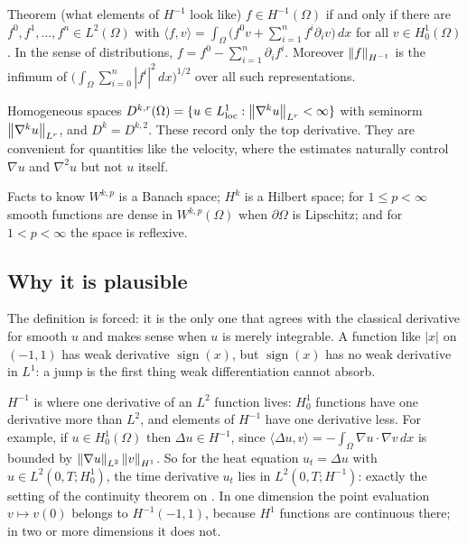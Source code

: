 \begin{thmbox}{Theorem (what elements of $H^{-1}$ look like)}
$f \in H^{-1}(\Omega)$ if and only if there are $f^0, f^1, \dots, f^n \in L^2(\Omega)$ with $\langle f, v\rangle = \int_\Omega \big(f^0 v + \sum_{i=1}^n f^i \partial_i v\big)\,dx$ for all $v \in H^1_0(\Omega)$. In the sense of distributions, $f = f^0 - \sum_{i=1}^n \partial_i f^i$. Moreover $\left\lVert f\right\rVert_{H^{-1}}$ is the infimum of $\big(\int_\Omega \sum_{i=0}^n |f^i|^2\,dx\big)^{1/2}$ over all such representations.
\end{thmbox}

\begin{defnbox}{Homogeneous spaces}
%
$D^{k,r}(\Omega) = \{ u \in L^1_{\mathrm{loc}} : \left\lVert \nabla^k u\right\rVert_{L^r} < \infty \}$ with seminorm $\left\lVert \nabla^k u\right\rVert_{L^r}$, and $D^k = D^{k,2}$. These record only the top derivative. They are convenient for quantities like the velocity, where the estimates naturally control $\nabla u$ and $\nabla^2 u$ but not $u$ itself.
\end{defnbox}

\begin{rmkbox}{Facts to know}
$W^{k,p}$ is a Banach space; $H^k$ is a Hilbert space; for $1 \le p < \infty$ smooth functions are dense in $W^{k,p}(\Omega)$ when $\partial\Omega$ is Lipschitz; and for $1 < p < \infty$ the space is reflexive.
\end{rmkbox}

\subsection*{Why it is plausible}

The definition is forced: it is the only one that agrees with the classical derivative for smooth $u$ and makes sense when $u$ is merely integrable. A function like $|x|$ on $(-1,1)$ has weak derivative $\operatorname{sign}(x)$, but $\operatorname{sign}(x)$ has no weak derivative in $L^1$: a jump is the first thing weak differentiation cannot absorb.

$H^{-1}$ is where one derivative of an $L^2$ function lives: $H^1_0$ functions have one derivative more than $L^2$, and elements of $H^{-1}$ have one derivative less. For example, if $u \in H^1_0(\Omega)$ then $\Delta u \in H^{-1}$, since $\langle \Delta u, v\rangle = -\int_\Omega \nabla u \cdot \nabla v\,dx$ is bounded by $\left\lVert \nabla u\right\rVert_{L^2}\left\lVert v\right\rVert_{H^1}$. So for the heat equation $u_t = \Delta u$ with $u \in L^2(0,T;H^1_0)$, the time derivative $u_t$ lies in $L^2(0,T;H^{-1})$: exactly the setting of the continuity theorem on . In one dimension the point evaluation $v \mapsto v(0)$ belongs to $H^{-1}(-1,1)$, because $H^1$ functions are continuous there; in two or more dimensions it does not.

